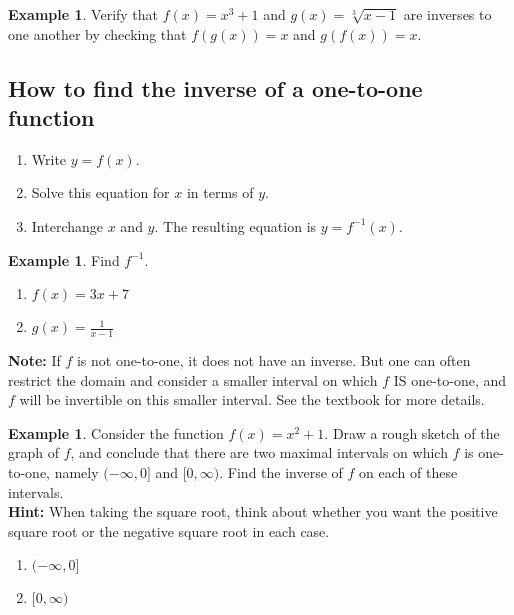 \documentclass[letterpaper,12pt,oneside]{book}
\theoremstyle{definition}
\newtheorem{example}[theorem]{Example}
\newcommand{\dsp}{\displaystyle}
\begin{document}
{\begin{example}
Verify that $f(x)=x^3+1$ and $g(x)=\sqrt[3]{x-1}$ are inverses to one another by checking that $f(g(x))=x$ and $g(f(x))=x$.
\vfill
\end{example}

\subsection*{How to find the inverse of a one-to-one function}
\begin{enumerate}[label=\arabic*.]
\item Write $y=f(x)$.
\item Solve this equation for $x$ in terms of $y$.
\item Interchange $x$ and $y$.  The resulting equation is $y=f^{-1}(x)$.
\end{enumerate}

\newpage

\begin{example}
Find $f^{-1}$.
\begin{enumerate}
\item $f(x)=3x+7$
\vfill
\item $g(x)=\dsp\frac{1}{x-1}$
\vfill
\end{enumerate}
\end{example}

\noindent
\textbf{Note:} If $f$ is not one-to-one, it does not have an inverse.  But one can often restrict the domain and consider a smaller interval on which $f$ IS one-to-one, and $f$ will be invertible on this smaller interval.  See the textbook for more details.

\begin{example}
Consider the function $f(x)=x^2+1$.  Draw a rough sketch of the graph of $f$, and conclude that there are two maximal intervals on which $f$ is one-to-one, namely $(-\infty,0]$ and $[0,\infty)$.  Find the inverse of $f$ on each of these intervals.\\
\textbf{Hint:} When taking the square root, think about whether you want the positive square root or the negative square root in each case.
\begin{enumerate}
\item $(-\infty,0]$
\vfill
\item $[0,\infty)$
\vfill
\end{enumerate}
\end{example}

\newpage

}
\end{document}
